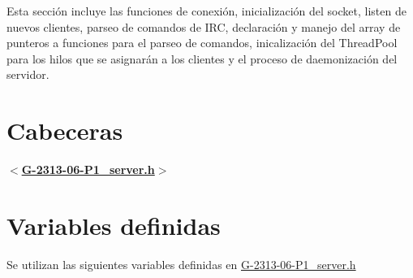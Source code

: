 Esta sección incluye las funciones de conexión, inicialización del socket, listen de nuevos clientes, parseo de comandos de I\+RC, declaración y manejo del array de punteros a funciones para el parseo de comandos, inicalización del Thread\+Pool para los hilos que se asignarán a los clientes y el proceso de daemonización del servidor.\hypertarget{server_connection_cabeceras}{}\section{Cabeceras}\label{server_connection_cabeceras}
{ {\bfseries $<$\hyperlink{G-2313-06-P1__server_8h}{G-\/2313-\/06-\/\+P1\+\_\+server.\+h}$>$} } \hypertarget{server_connection_variables}{}\section{Variables definidas}\label{server_connection_variables}
Se utilizan las siguientes variables definidas en \hyperlink{G-2313-06-P1__server_8h}{G-\/2313-\/06-\/\+P1\+\_\+server.\+h} 


